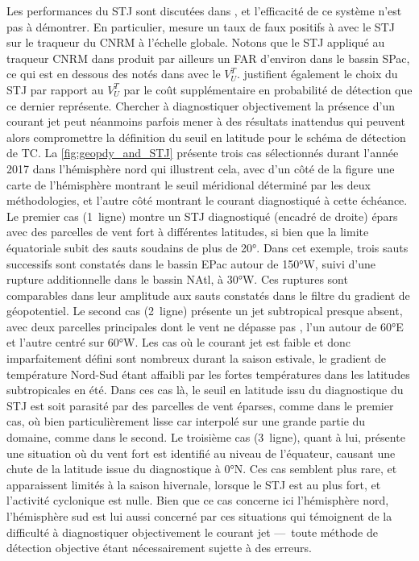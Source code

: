 \documentclass[../main.tex]{subfiles}
\begin{document}
Les performances du STJ sont discutées dans \textcite{bourdin_intercomparison_2022}, et l'efficacité de ce système n'est pas à démontrer. En particulier,
\textcite{bourdin_intercomparison_2022} mesure un taux de faux positifs à  avec le STJ sur le traqueur du CNRM à l'échelle globale. Notons que le STJ
appliqué au traqueur CNRM dans \textcite{bourdin_intercomparison_2022} produit par ailleurs un FAR d'environ  dans le bassin SPac, ce qui est en dessous
des  notés dans \textcite{dulac_assessing_2023} avec le $V_U^T$. \textcite{bourdin_intercomparison_2022} justifient également le choix du STJ par rapport au
$V_U^T$ par le coût supplémentaire en probabilité de détection que ce dernier représente. Chercher à diagnostiquer objectivement la présence d'un courant jet
peut néanmoins parfois mener à des résultats inattendus qui peuvent alors compromettre la définition du seuil en latitude pour le schéma de détection de TC. La
\cref{fig:geopdy_and_STJ} présente trois cas sélectionnés durant l'année 2017 dans l'hémisphère nord qui illustrent cela, avec d'un côté de la figure une carte
de l'hémisphère montrant le seuil méridional déterminé par les deux méthodologies, et l'autre côté montrant le courant diagnostiqué à cette échéance. Le premier
cas (1\iere~ligne) montre un STJ diagnostiqué (encadré de droite) épars avec des parcelles de vent fort à différentes latitudes, si bien que la limite
équatoriale subit des sauts soudains de plus de \ang{20}. Dans cet exemple, trois sauts successifs sont constatés dans le bassin EPac autour de \ang{150}W,
suivi d'une rupture additionnelle dans le bassin NAtl, à \ang{30}W. Ces ruptures sont comparables dans leur amplitude aux sauts constatés dans le filtre du
gradient de géopotentiel. Le second cas (2\ieme~ligne) présente un jet subtropical presque absent, avec deux parcelles principales dont le vent ne dépasse pas
, l'un autour de \ang{60}E et l'autre centré sur \ang{60}W. Les cas où le courant jet est faible et donc imparfaitement défini sont nombreux durant la
saison estivale, le gradient de température Nord-Sud étant affaibli par les fortes températures dans les latitudes subtropicales en été. Dans ces cas là, le
seuil en latitude issu du diagnostique du STJ est soit parasité par des parcelles de vent éparses, comme dans le premier cas, où bien particulièrement lisse car
interpolé sur une grande partie du domaine, comme dans le second. Le troisième cas (3\ieme~ligne), quant à lui, présente une situation où du vent fort est
identifié au niveau de l'équateur, causant une chute de la latitude issue du diagnostique à \ang{0}N. Ces cas semblent plus rare, et apparaissent limités à la
saison hivernale, lorsque le STJ est au plus fort, et l'activité cyclonique est nulle. Bien que ce cas concerne ici l'hémisphère nord, l'hémisphère sud est lui
aussi concerné par ces situations qui témoignent de la difficulté à diagnostiquer objectivement le courant jet ---~toute méthode de détection objective étant
nécessairement sujette à des erreurs.
\end{document}
